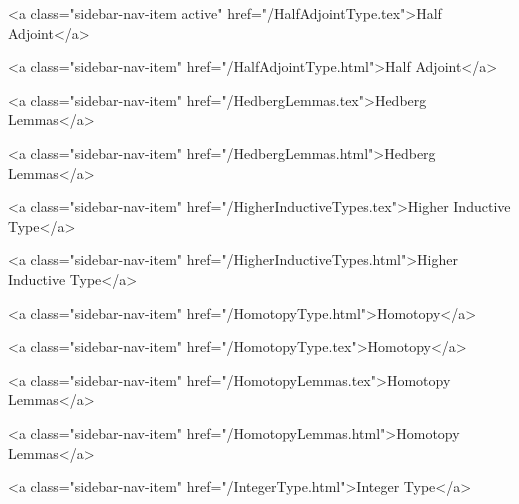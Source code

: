       
        
          <a class="sidebar-nav-item active" href="/HalfAdjointType.tex">Half Adjoint</a>
        
      
    
      
        
          <a class="sidebar-nav-item" href="/HalfAdjointType.html">Half Adjoint</a>
        
      
    
      
        
          <a class="sidebar-nav-item" href="/HedbergLemmas.tex">Hedberg Lemmas</a>
        
      
    
      
        
          <a class="sidebar-nav-item" href="/HedbergLemmas.html">Hedberg Lemmas</a>
        
      
    
      
        
          <a class="sidebar-nav-item" href="/HigherInductiveTypes.tex">Higher Inductive Type</a>
        
      
    
      
        
          <a class="sidebar-nav-item" href="/HigherInductiveTypes.html">Higher Inductive Type</a>
        
      
    
      
        
          <a class="sidebar-nav-item" href="/HomotopyType.html">Homotopy</a>
        
      
    
      
        
          <a class="sidebar-nav-item" href="/HomotopyType.tex">Homotopy</a>
        
      
    
      
        
          <a class="sidebar-nav-item" href="/HomotopyLemmas.tex">Homotopy Lemmas</a>
        
      
    
      
        
          <a class="sidebar-nav-item" href="/HomotopyLemmas.html">Homotopy Lemmas</a>
        
      
    
      
        
          <a class="sidebar-nav-item" href="/IntegerType.html">Integer Type</a>
        
